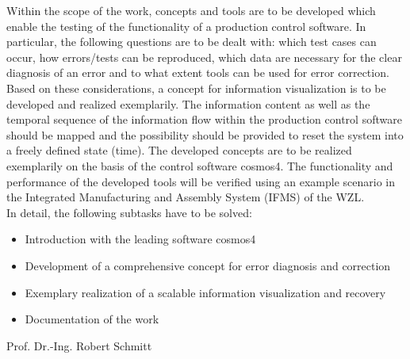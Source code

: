 Within the scope of the work, concepts and tools are to be developed which enable the testing of the functionality of a production control software. In particular, the following questions are to be dealt with: which test cases can occur, how errors/tests can be reproduced, which data are necessary for the clear diagnosis of an error and to what extent tools can be used for error correction. Based on these considerations, a concept for information visualization is to be developed and realized exemplarily. The information content as well as the temporal sequence of the information flow within the production control software should be mapped and the possibility should be provided to reset the system into a freely defined state (time). The developed concepts are to be realized exemplarily on the basis of the control software cosmos4. The functionality and performance of the developed tools will be verified using an example scenario in the Integrated Manufacturing and Assembly System (IFMS) of the WZL.\\

In detail, the following subtasks have to be solved:\\[-1cm]
\begin{itemize}
	\item Introduction with the leading software cosmos4
	\item Development of a comprehensive concept for error diagnosis and correction
	\item Exemplary realization of a scalable information visualization and recovery
	\item Documentation of the work
\end{itemize}
\vspace{4cm}

Prof. Dr.-Ing. Robert Schmitt

